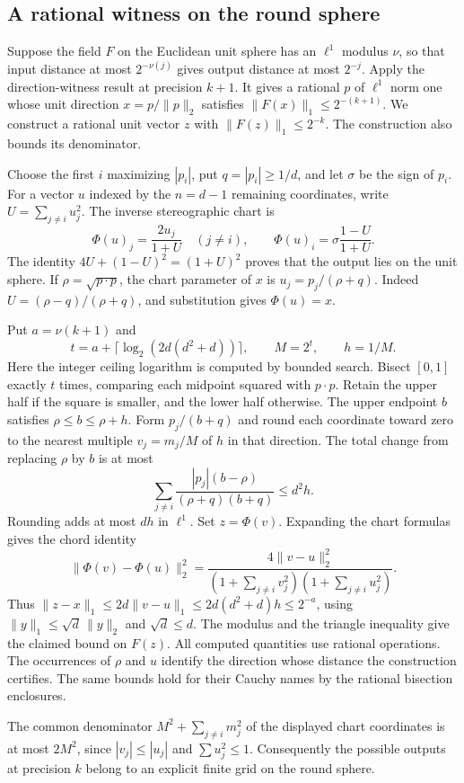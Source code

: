 \subsection{A rational witness on the round sphere}\label{sec:rational-round}

Suppose the field $F$ on the Euclidean unit sphere has an $\ell^1$
modulus $\nu$, so that input distance at most $2^{-\nu(j)}$ gives
output distance at most $2^{-j}$. Apply the direction-witness result at
precision $k+1$. It gives a rational $p$ of $\ell^1$ norm one whose
unit direction $x=p/\|p\|_2$ satisfies $\|F(x)\|_1\leq2^{-(k+1)}$.
We construct a rational unit vector $z$ with $\|F(z)\|_1\leq2^{-k}$.
The construction also bounds its denominator.

Choose the first $i$ maximizing $|p_i|$, put $q=|p_i|\geq 1/d$,
and let $\sigma$ be the sign of $p_i$. For a vector $u$
indexed by the $n=d-1$ remaining coordinates, write $U=\sum_{j\ne i}u_j^2$.
The inverse stereographic chart is
\[
  \Phi(u)_j=\frac{2u_j}{1+U}\quad(j\ne i),\qquad
  \Phi(u)_i=\sigma\frac{1-U}{1+U}.
\]
The identity $4U+(1-U)^2=(1+U)^2$ proves that the output lies on
the unit sphere. If $\rho=\sqrt{p\cdot p}$, the chart parameter of
$x$ is $u_j=p_j/(\rho+q)$. Indeed $U=(\rho-q)/(\rho+q)$, and
substitution gives $\Phi(u)=x$.

Put $a=\nu(k+1)$ and
\[
   t=a+\lceil\log_2(2d(d^2+d))\rceil,\qquad M=2^t,\qquad h=1/M .
\]
Here the integer ceiling logarithm is computed by bounded search.
Bisect $[0,1]$ exactly $t$ times, comparing each midpoint squared with
$p\cdot p$. Retain the upper half if the square is smaller, and the
lower half otherwise. The upper endpoint $b$ satisfies
$\rho\leq b\leq\rho+h$. Form $p_j/(b+q)$ and round each coordinate
toward zero to the nearest multiple $v_j=m_j/M$ of $h$ in that direction.
The total change from replacing $\rho$ by $b$ is at most
\[
  \sum_{j\ne i}\frac{|p_j|(b-\rho)}{(\rho+q)(b+q)}
      \leq d^2 h .
\]
Rounding adds at most $dh$ in $\ell^1$. Set $z=\Phi(v)$.
Expanding the chart formulas gives the chord identity
\[
 \|\Phi(v)-\Phi(u)\|_2^2=
 \frac{4\|v-u\|_2^2}
      {(1+\sum_{j\ne i}v_j^2)(1+\sum_{j\ne i}u_j^2)}.
\]
Thus $\|z-x\|_1\leq 2d\|v-u\|_1\leq2d(d^2+d)h\leq 2^{-a}$,
using $\|y\|_1\leq\sqrt d\,\|y\|_2$ and $\sqrt d\leq d$.
The modulus and the triangle inequality give the claimed bound on $F(z)$.
All computed quantities use rational operations. The occurrences of
$\rho$ and $u$ identify the direction whose distance the construction
certifies. The same bounds hold for their Cauchy names by the rational
bisection enclosures.

The common denominator $M^2+\sum_{j\ne i}m_j^2$ of the displayed
chart coordinates is at most $2M^2$, since $|v_j|\leq |u_j|$ and
$\sum u_j^2\leq1$. Consequently the possible outputs at precision $k$
belong to an explicit finite grid on the round sphere.

